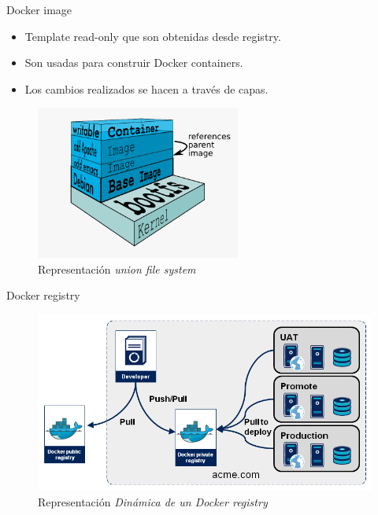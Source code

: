 \documentclass{bredelebeamer}
\begin{document}
\begin{frame}{Docker image}
\begin{itemize}
	\item Template read-only que son obtenidas desde registry.
	\item Son usadas para construir Docker containers.
	\item Los cambios realizados se hacen a través de capas.
\end{itemize}
\begin{figure}[H]
  \centering
  \includegraphics[width=0.6\textwidth]{images/docker-filesystems-multilayer}
    \caption{Representación \textit{union file system}}
    \label{fig:arquitectura}
\end{figure}	
\end{frame}

\begin{frame}{Docker registry}

\begin{figure}[H]
  \centering
  \includegraphics[width=\textwidth,height=0.8\textheight,keepaspectratio]{images/registry-dynamic.png}
    \caption{Representación \textit{Dinámica de un \textit{Docker registry} }}
    \label{fig:dynamic}
\end{figure}	
\end{frame}
\end{document}
